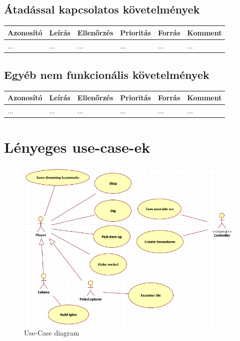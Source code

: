 \subsection{Átadással kapcsolatos követelmények}

\begin{longtable}{| l | l | l | l | l | l |}
\hline
\textbf{Azonosító}   & \textbf{Leírás} & \textbf{Ellenőrzés} & \textbf{Prioritás} & \textbf{Forrás} & \textbf{Komment} \tabularnewline
\hline\hline
... & ... & ... & ... & ... & ... \tabularnewline
\hline
\end{longtable}

\subsection{Egyéb nem funkcionális követelmények}

\begin{longtable}{| l | l | l | l | l | l |}
\hline
\textbf{Azonosító}   & \textbf{Leírás} & \textbf{Ellenőrzés} & \textbf{Prioritás} & \textbf{Forrás} & \textbf{Komment} \tabularnewline
\hline\hline
... & ... & ... & ... & ... & ... \tabularnewline
\hline
\end{longtable}


\section{Lényeges use-case-ek}
\begin{figure}[h]
	\begin{center}
		\includegraphics[width=17cm]{chapters/chapter02/use-case.png}
		\caption{Use-Case diagram}
		\label{fig:usecase}
	\end{center}
\end{figure}

